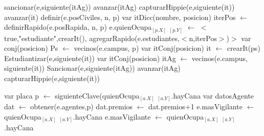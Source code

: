 \begin{algorithm}[H]
\begin{algorithmic}[1]
							 
								\State sancionar(e,siguiente(itAg)) 
							\EndIf
							\State avanzar(itAg)
						\EndWhile
					\Else
						  
							\State capturarHippie(e,siguiente(it)) 
						\EndIf
					\EndIf
				  \EndIf
					\State avanzar(it)
				\EndWhile
			  \EndIf
			\Else
				\State definir(e.posCiviles, n, p)  
				\State var itDicc(nombre, posicion) iterPos $\gets$ definirRapido(e.posRapida, n, p)  
				\State e.quienOcupa$_{[p.X]}$ $_{[p.Y]}$ $\gets$ $<$ true,"estudiante",crearIt(), agregarRapido(e.estudiantes,$<$n,iterPos$>$)$>$
				\State var conj(posicion) Ps $\gets$ vecinos(e.campus, p) 
				\State var itConj(posicion) it $\gets$ crearIt(ps) 
					 
						\State Estudiantizar(e,siguiente(it)) 
					\Else
						 
							\State var itConj(posicion) itAg $\gets$ vecinos(e.campus, siguiente(it)) 
								 
									\State Sancionar(e,siguiente(itAg)) 
								\EndIf
								\State avanzar(itAg)
							\EndWhile
						\Else
							 
								\State	capturarHippie(e,siguiente(it))  
							\EndIf
						\EndIf
					\EndIf
				\EndWhile
			\EndIf
\EndFunction
\end{algorithmic}
\end{algorithm}
\Function
				
	

\begin{algorithmic}
\begin{algorithm}
 
	\State var placa p $\gets$ siguienteClave(quienOcupa$_{[a.X]}$ $_{[a.Y]}$.hayCana 
	\State var datosAgente dat $\gets$ obtener(e.agentes,p) 
	\State dat.premios $\gets$ dat.premios$+$1 
	 
		\State e.masVigilante $\gets$ quienOcupa$_{[a.X]}$ $_{[a.Y]}$.hayCana 
	\Else
		 
			 
				\State e.masVigilante $\gets$ quienOcupa$_{[a.X]}$ $_{[a.Y]}$.hayCana 
			\EndIf
		\EndIf
	\EndIf
\EndFunction
\end{algorithm}
\end{algorithmic}

